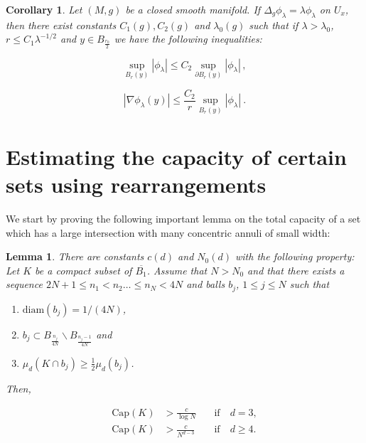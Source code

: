 \documentclass{amsart}
\newtheorem{corollary}[theorem]{Corollary}
\newtheorem{lemma}[theorem]{Lemma}
\begin{document}
\begin{corollary}\label{cor:ellipticestimates}
    Let $(M,g)$ be a closed smooth manifold. If $\Delta_g \phi_\lambda = \lambda \phi_\lambda$ on $U_x$, then there exist constants $C_1(g), C_2(g)$ and $\lambda_0(g)$ such that if $\lambda > \lambda_0$, $r \leq C_1 \lambda^{-1/2}$ and $y \in B_\frac{r_0}{2}$ we have the following inequalities:

    
\begin{equation}\label{eq:maxprinciple}
    \sup\limits_{B_r(y)} |\phi_\lambda| \leq C_2 \sup\limits_{\partial B_r(y)} |\phi_\lambda| \, ,
\end{equation}

\begin{equation}\label{eq:boundsderivatives}
    |\nabla \phi_\lambda(y)|\leq \frac{C_2}{r}\sup_{B_r(y)} |\phi_\lambda|\ .
\end{equation}

\end{corollary}






\section{Estimating the capacity of certain sets using rearrangements}\label{sec:capacity}



We start by proving the following important lemma on the total capacity of a set which has a large intersection with many  concentric annuli of small width:

\begin{lemma}\label{lemma:additivityofcapacity}
There are constants $c(d)$ and $N_0(d)$ with the following property: Let  $K$ be  a compact subset of $\overline{B_1}$. Assume that $N > N_0$ and that there exists a sequence $2N+1 \leq n_1 < n_2 \ldots \leq n_{N} < 4N$ and balls $b_{j}$, $1 \leq j \leq N$ such that 

\begin{enumerate}
    \item $\text{diam} (b_{j}) = 1/(4N)$, 
    \item $b_j \subset B_{\frac{n_j}{4N}} \backslash B_{\frac{n_j-1}{4N}}$ and
    \item $\mu_d(K \cap b_j) \geq \frac{1}{2}\mu_d(b_j)$.
\end{enumerate}

Then,

\begin{align}
    \text{Cap}(K) &> \frac{c}{\log N} \quad &  \text{if} \quad  d=3,\\
    \text{Cap}(K) &> \frac{c}{N^{d-3}} \quad & \text{if} \quad d\geq 4.
\end{align}
\end{lemma}
\end{document}
